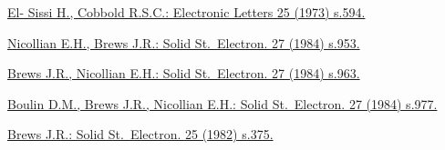 
\begin{thebibliography}{}

  \href{http://ieeexplore.ieee.org/xpl/login.jsp?tp=&arnumber=4236397&url=http\%3A\%2F\%2Fieeexplore.ieee.org\%2Fstamp\%2Fstamp.jsp\%3Ftp\%3D\%26arnumber\%3D4236397}
  {El- Sissi H., Cobbold R.S.C.: Electronic Letters 25 (1973) s.594.}
  
  \href{http://www.sciencedirect.com/science/article/pii/0038110184900698}
  {Nicollian E.H., Brews J.R.: Solid St.\ Electron. 27 (1984) s.953.}
  
  \href{http://www.sciencedirect.com/science/article/pii/0038110184900704}
  {Brews J.R., Nicollian E.H.: Solid St.\ Electron. 27 (1984) s.963.}
  
  \href{http://www.sciencedirect.com/science/article/pii/0038110184900716}
  {Boulin D.M., Brews J.R., Nicollian E.H.: Solid St.\ Electron. 27 (1984) s.977.}
  
  \href{http://www.sciencedirect.com/science/article/pii/0038110182901228}
  {Brews J.R.: Solid St.\ Electron. 25 (1982) s.375.}
  
\end{thebibliography}
